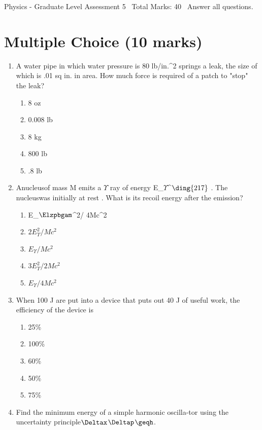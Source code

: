\documentclass[12pt]{article}
\begin{document}
\begin{center}
Physics - Graduate Level Assessment 5 \
Total Marks: 40 \
Answer all questions.
\end{center}

\section*{Multiple Choice (10 marks)}
\begin{enumerate}[label=\arabic*.]
\item A water pipe in which water pressure is 80 lb/in.\^{}2 springs a leak, the size of which is
.01 sq in. in area. How much force is required of a patch to "stop" the leak?
\begin{enumerate}[label=(\alph*)]
    \item 8 oz
    \item 0.008 lb
    \item 8 kg
    \item 800 lb
    \item .8 lb
\end{enumerate}
\item Anucleusof mass M emits a \ensuremath{\Upsilon} ray of energy E\_\ensuremath{\Upsilon}\^{}\ensuremath{\ding{217}} . The nucleuswas
initially at rest . What is its recoil energy after the emission?
\begin{enumerate}[label=(\alph*)]
    \item E\_\ensuremath{\Elzpbgam}\^{}2/ 4Mc\^{}2
    \item \( 2E_{\Upsilon}^2 / Mc^2 \)
    \item \( E_{\Upsilon} / Mc^2 \)
    \item \( 3E_{\Upsilon}^2 / 2Mc^2 \)
    \item \( E_{\Upsilon} / 4Mc^2 \)
\end{enumerate}
\item When 100 J are put into a device that puts out 40 J of useful work, the efficiency of the
device is
\begin{enumerate}[label=(\alph*)]
    \item 25\%
    \item 100\%
    \item 60\%
    \item 50\%
    \item 75\%
\end{enumerate}
\item Find the minimum energy of a simple harmonic oscilla-tor using the uncertainty
principle\ensuremath{\Deltax}\ensuremath{\Deltap}\ensuremath{\geqh}.

\end{enumerate}
\end{document}
